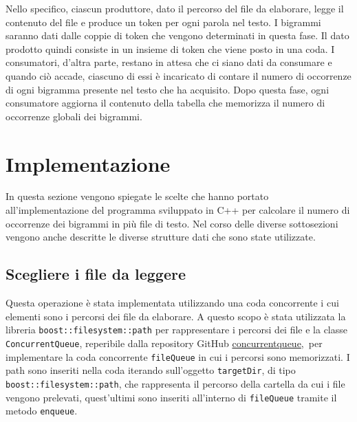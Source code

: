 \documentclass[10pt,twocolumn,letterpaper]{article}
\begin{document}
Nello specifico, ciascun produttore, dato il percorso del file da elaborare, legge il contenuto del file e produce un token per ogni parola nel testo. 
I bigrammi saranno dati 
dalle coppie di token che vengono determinati in questa fase. Il dato prodotto quindi
consiste in un insieme di token che viene posto in una coda. I consumatori, 
d'altra parte, restano in attesa che ci siano dati da consumare e quando ciò accade, ciascuno di essi è incaricato di contare il numero di occorrenze di ogni bigramma presente nel testo che ha acquisito. Dopo questa fase, ogni consumatore
aggiorna il contenuto della tabella che memorizza il numero di occorrenze globali dei bigrammi.






\section{Implementazione}
\label{sec:implementazione}
In questa sezione vengono spiegate le scelte che hanno portato all'implementazione del programma sviluppato in C++ per calcolare il numero di occorrenze dei bigrammi in più file di testo. Nel corso delle diverse sottosezioni vengono anche descritte le diverse strutture dati che sono state utilizzate.
\subsection{Scegliere i file da leggere}
\label{sub:sceltafiledaleggere}
Questa operazione è stata implementata utilizzando una coda concorrente i cui elementi sono i percorsi dei file da elaborare.
A questo scopo è stata utilizzata la libreria \texttt{boost::filesystem::path} per rappresentare i percorsi dei file e la classe \texttt{ConcurrentQueue}, reperibile dalla repository GitHub \href{https://github.com/cameron314/concurrentqueue}{concurrentqueue},\ per implementare la coda concorrente \texttt{fileQueue} in cui i percorsi sono memorizzati. I path sono inseriti nella coda iterando sull'oggetto \texttt{targetDir}, di tipo \texttt{boost::filesystem::path},
che rappresenta il percorso della cartella da cui i file vengono prelevati, quest'ultimi sono inseriti all'interno di \texttt{fileQueue} tramite il metodo \texttt{enqueue}.


\end{document}
